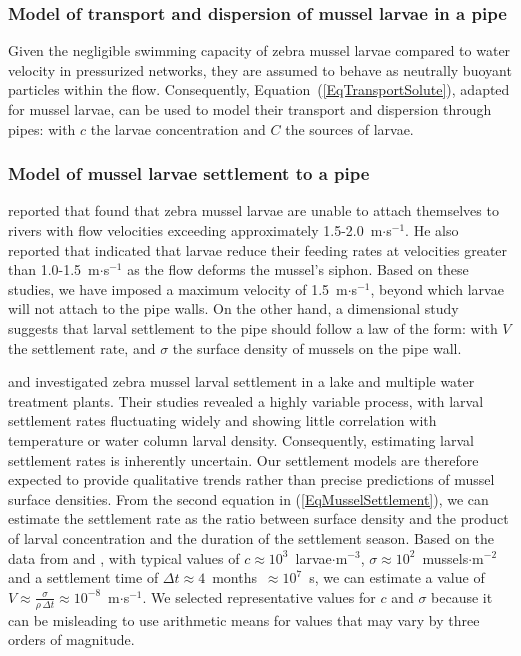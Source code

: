 \documentclass[review,authoryear]{elsarticle}
\begin{document}
\subsubsection{Model of transport and dispersion of mussel larvae in a pipe}

Given the negligible swimming capacity of zebra mussel larvae compared to water
velocity in pressurized networks, they are assumed to behave as neutrally
buoyant particles within the flow. Consequently,
Equation~(\ref{EqTransportSolute}), adapted for mussel larvae, can be used to
model their transport and dispersion through pipes:
with $c$ the larvae concentration and $C$ the sources of larvae.

\subsubsection{Model of mussel larvae settlement to a pipe}

\citet{Cohen05} reported that \citet{Boelman97} found that zebra mussel larvae
are unable to attach themselves to rivers with flow velocities exceeding
approximately 1.5-2.0~m$\cdot$s$^{-1}$. He also reported that
\citet{SmirnovaVinogradov90} indicated that larvae reduce their feeding rates at
velocities greater than 1.0-1.5~m$\cdot$s$^{-1}$ as the flow deforms the
mussel's siphon. Based on these studies, we have imposed a maximum velocity of
1.5~m$\cdot$s$^{-1}$, beyond which larvae will not attach to the pipe walls. On
the other hand, a dimensional study suggests that larval settlement to the pipe
should follow a law of the form:
with $V$ the settlement rate, and $\sigma$ the surface density of mussels on
the pipe wall.

\citet{Alix16} and \citet{AlonzoMoya21} investigated zebra mussel larval
settlement in a lake and multiple water treatment plants. Their studies revealed
a highly variable process, with larval settlement rates fluctuating widely and
showing little correlation with temperature or water column larval density.
Consequently, estimating larval settlement rates is inherently uncertain. Our
settlement models are therefore expected to provide qualitative trends rather
than precise predictions of mussel surface densities. From the second equation
in (\ref{EqMusselSettlement}), we can estimate the settlement rate as the ratio
between surface density and the product of larval concentration and the duration
of the settlement season. Based on the data from \citet{Alix16} and
\citet{AlonzoMoya21}, with typical values of 
$c\approx 10^3$~larvae$\cdot$m$^{-3}$,
$\sigma\approx 10^2$~mussels$\cdot$m$^{-2}$ and a settlement time of
$\Delta t\approx4$~months~$\approx10^7$~s, we can estimate a value of
$V\approx\frac{\sigma}{\rho\,\Delta t}\approx10^{-8}$~m$\cdot$s$^{-1}$. We
selected representative values for $c$ and $\sigma$ because it can be misleading
to use arithmetic means for values that may vary by three orders of magnitude.
\end{document}
